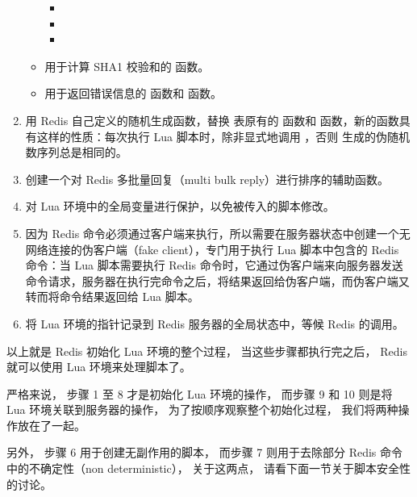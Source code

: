 \documentclass[a4paper,11pt,english]{sphinxmanual}
\begin{document}
\begin{enumerate}
\begin{itemize}
\begin{itemize}
\item {} 

\item {} 

\item {} 

\end{itemize}

\item {} 
用于计算 SHA1 校验和的  函数。

\item {} 
用于返回错误信息的  函数和  函数。

\end{itemize}

\item {} 
用 Redis 自己定义的随机生成函数，替换  表原有的  函数和  函数，新的函数具有这样的性质：每次执行 Lua 脚本时，除非显式地调用  ，否则  生成的伪随机数序列总是相同的。

\item {} 
创建一个对 Redis 多批量回复（multi bulk reply）进行排序的辅助函数。

\item {} 
对 Lua 环境中的全局变量进行保护，以免被传入的脚本修改。

\item {} 
因为 Redis 命令必须通过客户端来执行，所以需要在服务器状态中创建一个无网络连接的伪客户端（fake client），专门用于执行 Lua 脚本中包含的 Redis 命令：当 Lua 脚本需要执行 Redis 命令时，它通过伪客户端来向服务器发送命令请求，服务器在执行完命令之后，将结果返回给伪客户端，而伪客户端又转而将命令结果返回给 Lua 脚本。

\item {} 
将 Lua 环境的指针记录到 Redis 服务器的全局状态中，等候 Redis 的调用。

\end{enumerate}

以上就是 Redis 初始化 Lua 环境的整个过程，
当这些步骤都执行完之后，
Redis 就可以使用 Lua 环境来处理脚本了。

严格来说，
步骤 1 至 8 才是初始化 Lua 环境的操作，
而步骤 9 和 10 则是将 Lua 环境关联到服务器的操作，
为了按顺序观察整个初始化过程，
我们将两种操作放在了一起。

另外，
步骤 6 用于创建无副作用的脚本，
而步骤 7 则用于去除部分 Redis 命令中的不确定性（non deterministic），
关于这两点，
请看下面一节关于脚本安全性的讨论。
\end{document}

